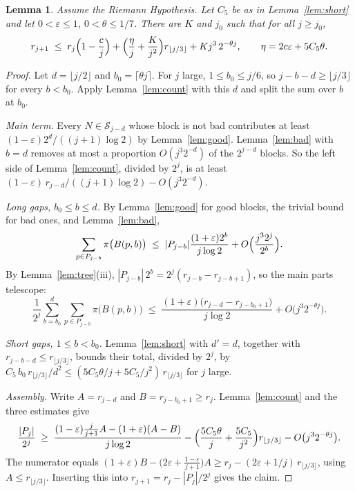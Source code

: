 \documentclass[11pt]{amsart}
\newtheorem{lemma}{Lemma}[section]
\newcommand{\Sset}{\mathcal{S}}
\begin{document}
\begin{lemma}
\label{lem:rec}
Assume the Riemann Hypothesis. Let $C_5$ be as in Lemma~\ref{lem:short}
and let $0 < \varepsilon \le 1$, $0 < \theta \le 1/7$. There are $K$ and
$j_0$ such that for all $j \ge j_0$,
\[
r_{j+1} \;\le\; r_j \Bigl(1 - \frac{c}{j}\Bigr)
+ \Bigl(\frac{\eta}{j} + \frac{K}{j^2}\Bigr) r_{\lfloor j/3 \rfloor}
+ K j^3\, 2^{-\theta j},
\qquad \eta = 2c\varepsilon + 5 C_5 \theta .
\]
\end{lemma}

\begin{proof}
Let $d = \lfloor j/2 \rfloor$ and $b_0 = \lceil \theta j\rceil$. For $j$
large, $1 \le b_0 \le j/6$, so $j - b - d \ge \lfloor j/3 \rfloor$ for
every $b < b_0$. Apply Lemma~\ref{lem:count} with this $d$ and split the
sum over $b$ at $b_0$.

\emph{Main term.} Every $N \in \Sset_{j-d}$ whose block is not bad
contributes at least $(1-\varepsilon) 2^d/((j+1)\log 2)$ by
Lemma~\ref{lem:good}. Lemma~\ref{lem:bad} with $b = d$ removes at most a
proportion $O(j^3 2^{-d})$ of the $2^{j-d}$ blocks. So the left side of
Lemma~\ref{lem:count}, divided by $2^j$, is at least
$(1-\varepsilon)\, r_{j-d} / ((j+1)\log 2) - O(j^3 2^{-d})$.

\emph{Long gaps, $b_0 \le b \le d$.} By Lemma~\ref{lem:good} for good
blocks, the trivial bound for bad ones, and Lemma~\ref{lem:bad},
\[
\sum_{p \in P_{j-b}} \pi\bigl(B(p,b)\bigr) \;\le\; |P_{j-b}|
\frac{(1+\varepsilon)2^b}{j\log 2} + O\Bigl(\frac{j^3 2^j}{2^b}\Bigr).
\]
By Lemma~\ref{lem:tree}(iii), $|P_{j-b}|\, 2^b = 2^j (r_{j-b} -
r_{j-b+1})$, so the main parts telescope:
\[
\frac{1}{2^j}\sum_{b=b_0}^{d} \sum_{p \in P_{j-b}} \pi\bigl(B(p,b)\bigr)
\;\le\; \frac{(1+\varepsilon)\bigl(r_{j-d} - r_{j-b_0+1}\bigr)}{j \log 2}
+ O\bigl(j^3 2^{-\theta j}\bigr).
\]

\emph{Short gaps, $1 \le b < b_0$.} Lemma~\ref{lem:short} with $d' = d$,
together with $r_{j-b-d} \le r_{\lfloor j/3\rfloor}$, bounds their total,
divided by $2^j$, by $C_5\, b_0\, r_{\lfloor j/3 \rfloor}/d^2 \le (5 C_5
\theta/j + 5C_5/j^2)\, r_{\lfloor j/3\rfloor}$ for $j$ large.

\emph{Assembly.} Write $A = r_{j-d}$ and $B = r_{j-b_0+1} \ge r_j$.
Lemma~\ref{lem:count} and the three estimates give
\[
\frac{|P_j|}{2^j} \;\ge\; \frac{(1-\varepsilon)\frac{j}{j+1} A -
(1+\varepsilon)(A - B)}{j \log 2} - \Bigl(\frac{5C_5\theta}{j} +
\frac{5C_5}{j^2}\Bigr) r_{\lfloor j/3\rfloor} - O\bigl(j^3 2^{-\theta
j}\bigr).
\]
The numerator equals $(1+\varepsilon)B - \bigl(2\varepsilon +
\frac{1-\varepsilon}{j+1}\bigr) A \ge r_j - (2\varepsilon + 1/j)\,
r_{\lfloor j/3 \rfloor}$, using $A \le r_{\lfloor j/3\rfloor}$. Inserting
this into $r_{j+1} = r_j - |P_j|/2^j$ gives the claim.
\end{proof}
\end{document}
